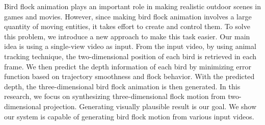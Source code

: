 Bird flock animation plays an important role in making realistic outdoor scenes in games and movies. However, since making bird flock animation involves a large quantity of moving entities, it takes effort to create and control them. To solve this problem, we introduce a new approach to make this task easier. Our main idea is using a single-view video as input.  From the input video, by using animal tracking technique, the two-dimensional position of each bird is retrieved in each frame. We then predict the depth information of each bird by minimizing error function based on trajectory smoothness and flock behavior. With the predicted depth, the three-dimensional bird flock animation is then generated. In this research, we focus on synthesizing three-dimensional flock motion from two-dimensional projection. Generating visually plausible result is our goal. We show our system is capable of generating bird flock motion from various input videos.